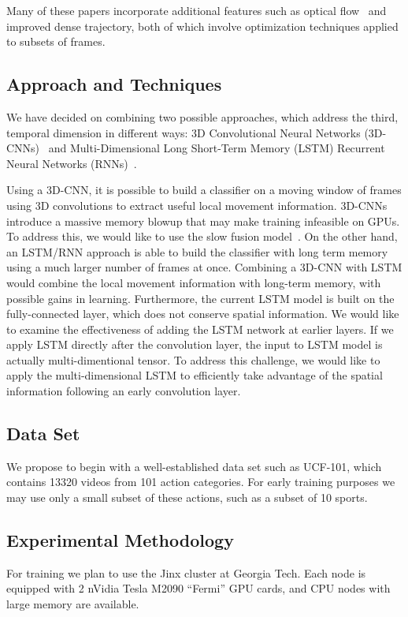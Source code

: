 Many of these papers incorporate additional features such as optical flow~\cite{brox} and improved dense trajectory, both of which involve optimization techniques applied to subsets of frames. 
\subsection*{Approach and Techniques}
We have decided on combining two possible approaches, which address
the third, temporal dimension in different ways: 3D Convolutional Neural
Networks (3D-CNNs)~\cite{stf,cnnvid} and Multi-Dimensional Long
Short-Term Memory (LSTM) Recurrent Neural Networks (RNNs)~\cite{ltrcn}. 

Using a 3D-CNN, it is possible to build a classifier on a moving window
of frames using 3D convolutions to extract useful local movement information. 3D-CNNs introduce a massive memory blowup that may make training infeasible on GPUs.
To address this, we would like to use the slow fusion model~\cite{cnnvid}. On the other hand, an LSTM/RNN approach is
able to build the classifier with long term memory
using a much larger number of frames at once. 
Combining a 3D-CNN with LSTM would combine the
local movement information with long-term memory, with possible gains in learning.
Furthermore, the current LSTM model is built on the fully-connected
layer, which does not conserve spatial information. We would like to examine the 
effectiveness of adding the LSTM network at earlier layers.
If we apply LSTM directly after the convolution layer,
the input to LSTM model is actually multi-dimentional tensor. To address
this challenge, we would like to apply the multi-dimensional LSTM
\cite{byeon2015scene} to efficiently take advantage of the spatial
information following an early convolution layer. 

\subsection*{Data Set}
We propose to begin with a well-established data set such as UCF-101, which contains 13320 videos from 101 action categories. For early training purposes we may use only a small subset of these actions, such as a subset of 10 sports.

\subsection*{Experimental Methodology}
For training we plan to use the Jinx cluster at Georgia Tech. Each node is equipped with 2 nVidia Tesla M2090 ``Fermi'' GPU cards, and CPU nodes with large memory are available.

